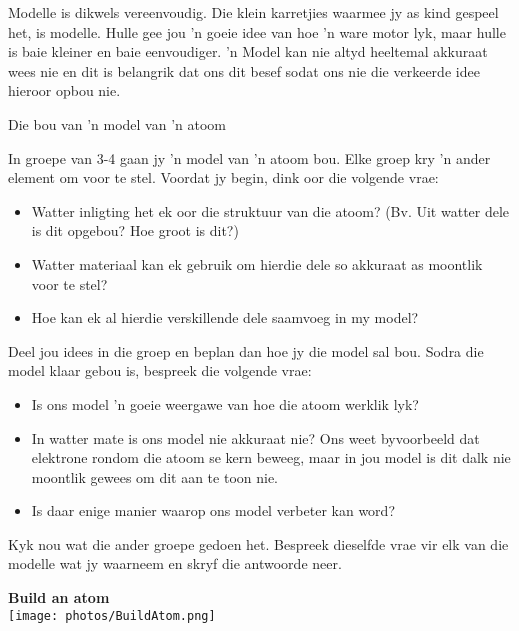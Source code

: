 Modelle is dikwels vereenvoudig. Die klein karretjies waarmee jy as kind gespeel het, is modelle. Hulle gee jou 'n goeie idee van hoe 'n ware motor lyk, maar hulle is baie kleiner en baie eenvoudiger. 'n Model kan nie altyd heeltemal akkuraat wees nie en dit is belangrik dat ons dit besef sodat ons nie die verkeerde idee hieroor opbou nie.\par 
\begin{groupdiscussion}{Die bou van 'n model van 'n atoom}
\nopagebreak
\begin{multicols}{2}
In groepe van 3-4 gaan jy 'n model van 'n atoom bou. Elke groep kry 'n ander element om voor te stel. Voordat jy begin, dink oor die volgende vrae:\par 
\begin{itemize}[noitemsep]
\item Watter inligting het ek oor die struktuur van die atoom? (Bv. Uit watter dele is dit opgebou? Hoe groot is dit?)
\item Watter materiaal kan ek gebruik om hierdie dele so akkuraat as moontlik voor te stel?
\item Hoe kan ek al hierdie verskillende dele saamvoeg in my model?
\end{itemize}

Deel jou idees in die groep en beplan dan hoe jy die model sal bou. Sodra die model klaar gebou is, bespreek die volgende vrae:\par 
\begin{itemize}[noitemsep]
\item Is ons model 'n goeie weergawe van hoe die atoom werklik lyk?
\item In watter mate is ons model nie akkuraat nie? Ons weet byvoorbeeld dat elektrone rondom die atoom se kern beweeg, maar in jou model is dit dalk nie moontlik gewees om dit aan te toon nie.
\item Is daar enige manier waarop ons model verbeter kan word?
\end{itemize}

Kyk nou wat die ander groepe gedoen het. Bespreek dieselfde vrae vir elk van die modelle wat jy waarneem en skryf die antwoorde neer. \par 
\end{multicols}
\begin{center}
\textbf{Build an atom}\\
 \texttt{[image: photos/BuildAtom.png]}
\end{center}

\end{groupdiscussion}   

